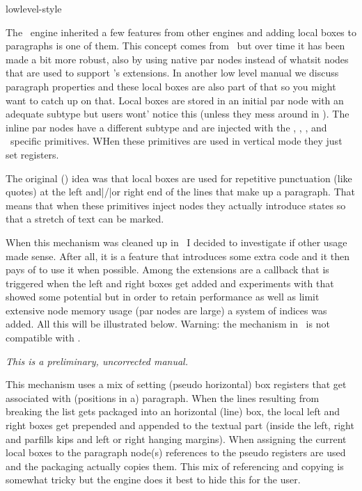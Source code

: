 

\environment lowlevel-style

\startdocument
  [title=localboxes,
   color=middlered]

\startsectionlevel[title=Introduction]

The \LUATEX\ engine inherited a few features from other engines and adding local
boxes to paragraphs is one of them. This concept comes from \OMEGA\ but over time
it has been made a bit more robust, also by using native par nodes instead of
whatsit nodes that are used to support \TEX's extensions. In another low level
manual we discuss paragraph properties and these local boxes are also part of
that so you might want to catch up on that. Local boxes are stored in an initial
par node with an adequate subtype but users wont' notice this (unless they mess
around in \LUA). The inline par nodes have a different subtype and are injected
with the \typ {\localinterlinepenalty}, \typ {\localbrokenpenalty}, \typ
{\localleftbox}, \typ {\localrightbox} and \LUAMETATEX\ specific \typ
{\localmiddlebox} primitives. WHen these primitives are used in vertical mode
they just set registers.

The original (\OMEGA) idea was that local boxes are used for repetitive
punctuation (like quotes) at the left and|/|or right end of the lines that make
up a paragraph. That means that when these primitives inject nodes they actually
introduce states so that a stretch of text can be marked.

When this mechanism was cleaned up in \LUAMETATEX\ I decided to investigate if
other usage made sense. After all, it is a feature that introduces some extra
code and it then pays of to use it when possible. Among the extensions are a
callback that is triggered when the left and right boxes get added and
experiments with that showed some potential but in order to retain performance as
well as limit extensive node memory usage (par nodes are large) a system of
indices was added. All this will be illustrated below. Warning: the mechanism in
\LUAMETATEX\ is not compatible with \LUATEX.

{\em This is a preliminary, uncorrected manual.}

\stopsectionlevel

\startsectionlevel[title=The basics]

This mechanism uses a mix of setting (pseudo horizontal) box registers that get
associated with (positions in a) paragraph. When the lines resulting from
breaking the list gets packaged into an horizontal (line) box, the local left and
right boxes get prepended and appended to the textual part (inside the left,
right and parfills kips and left or right hanging margins). When assigning the
current local boxes to the paragraph node(s) references to the pseudo registers
are used and the packaging actually copies them. This mix of referencing and
copying is somewhat tricky but the engine does it best to hide this for the user.

